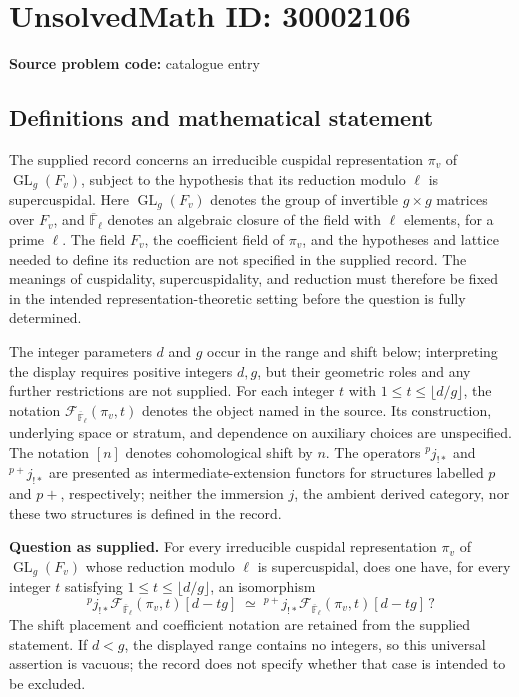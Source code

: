 \documentclass[11pt]{article}
\begin{document}
\section*{UnsolvedMath ID: 30002106}
\textbf{Source problem code:} catalogue entry
\subsection{Definitions and mathematical statement}
The supplied record concerns an irreducible cuspidal representation \(\pi_v\) of \(\operatorname{GL}_g(F_v)\), subject to the hypothesis that its reduction modulo \(\ell\) is supercuspidal. Here \(\operatorname{GL}_g(F_v)\) denotes the group of invertible \(g\times g\) matrices over \(F_v\), and \(\overline{\mathbb F}_\ell\) denotes an algebraic closure of the field with \(\ell\) elements, for a prime \(\ell\). The field \(F_v\), the coefficient field of \(\pi_v\), and the hypotheses and lattice needed to define its reduction are not specified in the supplied record. The meanings of cuspidality, supercuspidality, and reduction must therefore be fixed in the intended representation-theoretic setting before the question is fully determined.

The integer parameters \(d\) and \(g\) occur in the range and shift below; interpreting the display requires positive integers \(d,g\), but their geometric roles and any further restrictions are not supplied. For each integer \(t\) with \(1\leq t\leq\lfloor d/g\rfloor\), the notation \(\mathcal F_{\overline{\mathbb F}_\ell}(\pi_v,t)\) denotes the object named in the source. Its construction, underlying space or stratum, and dependence on auxiliary choices are unspecified. The notation \([n]\) denotes cohomological shift by \(n\). The operators \({}^{p}j_{!*}\) and \({}^{p+}j_{!*}\) are presented as intermediate-extension functors for structures labelled \(p\) and \(p+\), respectively; neither the immersion \(j\), the ambient derived category, nor these two structures is defined in the record.

\textbf{Question as supplied.} For every irreducible cuspidal representation \(\pi_v\) of \(\operatorname{GL}_g(F_v)\) whose reduction modulo \(\ell\) is supercuspidal, does one have, for every integer \(t\) satisfying \(1\leq t\leq\lfloor d/g\rfloor\), an isomorphism
\[
{}^{p}j_{!*}\mathcal F_{\overline{\mathbb F}_\ell}(\pi_v,t)[d-tg]
\;\simeq\;
{}^{p+}j_{!*}\mathcal F_{\overline{\mathbb F}_\ell}(\pi_v,t)[d-tg] \, ?
\]
The shift placement and coefficient notation are retained from the supplied statement. If \(d<g\), the displayed range contains no integers, so this universal assertion is vacuous; the record does not specify whether that case is intended to be excluded.
\end{document}
